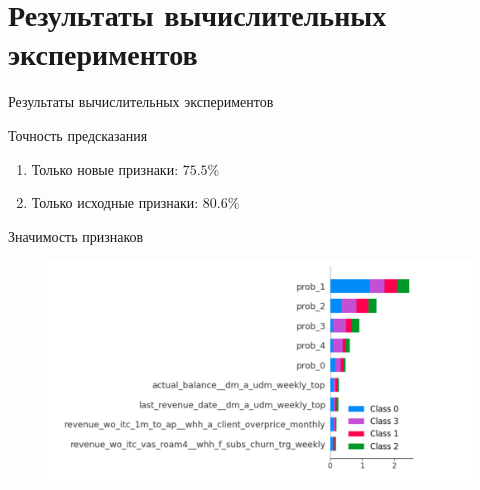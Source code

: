 \documentclass[10pt,pdf,hyperref={unicode}]{beamer}
\renewcommand{\figurename}{}{}%
\renewcommand{\figurename}{\relax}%
\begin{document}
\section{Результаты вычислительных экспериментов}
\begin{frame}{Результаты вычислительных экспериментов}
	
	\begin{block}{Точность предсказания}
		\begin{enumerate}[1)]
		\item Только новые признаки: $75.5\%$
		\item Только исходные признаки: $80.6\%$
	\end{enumerate}	

		
	\end{block}
	
	
	\begin{block}{Значимость признаков}
 
 	\begin{figure}[h!]
 	
 	\begin{minipage}{0.8\textwidth}
 		\centering
 		\includegraphics[width=\linewidth]{../figures/deephit_shap_baseline1.2.png}
 		\renewcommand{\figurename}{}{}%
 	\end{minipage}
 \end{figure}
 
	\end{block}
	
\end{frame}



\end{document}
